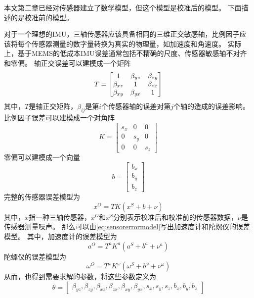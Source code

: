 \documentclass[
  type=master
]{gdutthesis}
\begin{document}
本文第二章已经对传感器建立了数学模型，但这个模型是校准后的模型。
下面描述的是校准前的模型。

对于一个理想的IMU，三轴传感器应该具备相同的三维正交敏感轴，比例因子应该将每个传感器测量的数字量转换为真实的物理量，如加速度和角速度。
实际上，基于MEMS的低成本IMU误差通常包括不精确的尺度、传感器敏感轴不对齐和零偏。
轴正交误差可以建模成一个矩阵
\begin{equation}\label{eq:axiserror}
	T=
	\begin{bmatrix}
		1 & \beta_{yz} & \beta_{zy}\\
		\beta_{xz} & 1 & \beta_{zx}\\
		\beta_{xy} & \beta_{yx} & 1
	\end{bmatrix}\vspace{1ex}
\end{equation}
其中，$T$是轴正交矩阵，$\beta_{ij}$是第$i$个传感器轴的误差对第$j$个轴的造成的误差影响。
比例因子误差可以建模成一个对角阵
\begin{equation}\label{eq:scaleerror}
	K=
	\begin{bmatrix}
		s_x & 0 & 0\\
		0 & s_y & 0\\
		0 & 0 & s_z
	\end{bmatrix}
\end{equation}
零偏可以建模成一个向量
\begin{equation}\label{eq:scaleerror}
	b=
	\begin{bmatrix}
		b_x\\
		b_y\\
		b_z
	\end{bmatrix}
\end{equation}
完整的传感器误差模型为
\begin{equation}\label{eq:sensorerrormodel}
	x^O=T K (x^S + b + \nu)
\end{equation}
其中，$x$指一种三轴传感器，$x^O$和$x^S$分别表示校准后和校准前的传感器数据，$ν$是传感器测量噪声。
那么可以由\autoref{eq:sensorerrormodel}写出加速度计和陀螺仪的误差模型。
其中，加速度计的误差模型为
\begin{equation}
	a^O=T^a K^a (a^S + b^a + \nu^a)
\end{equation}
陀螺仪的误差模型为
\begin{equation}\label{eq:accerrormodel}
	\omega^O=T^\omega K^\omega (\omega^S + b^\omega + \nu^\omega)
\end{equation}
从而，也得到需要求解的参数，将这些参数定义为
\begin{equation}\label{eq:thetadef}
	\theta = 
	\begin{bmatrix}
		\beta_{yz},\beta_{zy},\beta_{xz},\beta_{zx},\beta_{xy}, \beta_{yx},s_x,s_y,s_z,b_x,b_y,b_z
	\end{bmatrix}
\end{equation}
\end{document}
